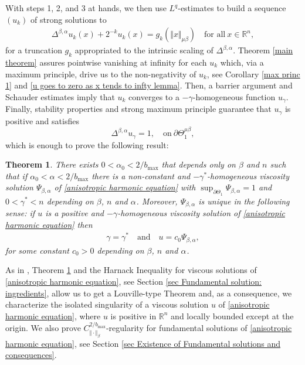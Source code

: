 \documentclass[10pt, leqno]{article}
\newtheorem{theorem}{Theorem}[section]
\theoremstyle{definition}
\theoremstyle{remark}
\numberwithin{equation}{section}
\begin{document}
With steps 1, 2, and 3 at hands, we then use $L^{q}$-estimates to build a sequence $(u_{k})$ of strong solutions to
\begin{eqnarray}
\Delta^{\beta, \alpha}u_{k}(x) + 2^{-k}u_{k}(x) = g_{k}\left(\Vert x \Vert^{}_{\mu \beta}\right) \quad \text{for all} \ x \in \mathbb{R}^{n},
\end{eqnarray}
for a truncation $g_{k}$ appropriated to the intrinsic scaling of $\Delta^{\beta, \alpha}$. Theorem \ref{main theorem} assures pointwise vanishing at infinity for each $u_{k}$ which, via a maximum principle, drive us to the non-negativity of $u_{k}$, see Corollary \ref{max princ 1} and \ref{u goes to zero as x tends to infty lemma}. Then, a barrier argument and Schauder estimates imply that $u_{k}$ converges to a $-\gamma$-homogeneous function $u_{\gamma}$. Finally, stability properties and strong maximum principle guarantee that $u_{\gamma}$ is positive and satisfies
$$
\Delta^{\beta, \alpha} u_{\gamma} = 1, \quad \text{on} \ \partial \Theta^{\mu \beta}_{1},
$$
which is enough to prove the following result:
\begin{theorem}
\label{existence of fundamental solutions}
There exists $0< \alpha_{0} < 2/b_{\max}$ that depends only on $\beta$ and $n$ such that if $\alpha_{0} < \alpha < 2/b_{\max}$ there is a non-constant and $-\gamma^{\ast}$-homogeneous viscosity solution $\Psi_{\beta, \alpha}$ of \eqref{anisotropic harmonic equation} with $\displaystyle\sup_{\partial \Theta_{1}}\Psi_{\beta, \alpha} = 1$ and $0 < \gamma^{\ast}< n$ depending on $\beta$, $n$ and $\alpha_{}$. Moreover, $\Psi_{\beta, \alpha}$ is unique in the following sense: if $u$ is a positive and $-\gamma$-homogeneous viscosity solution of \eqref{anisotropic harmonic equation} then
\begin{eqnarray}
\gamma = \gamma^{\ast} \quad \text{and} \quad u = c_{0}\Psi_{\beta, \alpha},
\end{eqnarray}
for some constant $c_{0}>0$ depending on $\beta$, $n$ and $\alpha_{}$.
\end{theorem}
As in \cite{CWW}, Theorem \ref{existence of fundamental solutions} and the Harnack Inequality for viscous solutions of \eqref{anisotropic harmonic equation}, see Section \ref{sec Fundamental solution: ingredients}, allow us to get a Louville-type Theorem and, as a consequence, we characterize the isolated singularity of a viscous solution $u$ of \eqref{anisotropic harmonic equation}, where $u$ is positive in $\mathbb{R}^{n}$ and locally bounded except at the origin. We also prove $C_{\Vert \cdot \Vert_{\beta}}^{2/b_{\max}}$-regularity for fundamental solutions of \eqref{anisotropic harmonic equation}, see Section \ref{sec Existence of Fundamental solutions and consequences}.
\end{document}

